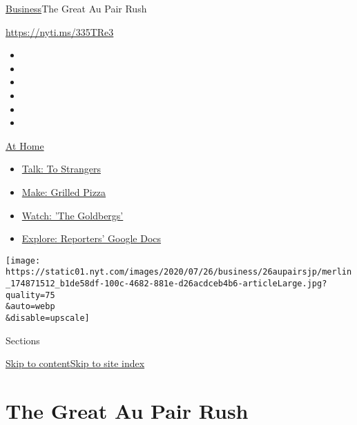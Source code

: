 \href{/section/business}{Business}\textbar{}The Great Au Pair Rush

\url{https://nyti.ms/335TRe3}

\begin{itemize}
\item
\item
\item
\item
\item
\item
\end{itemize}

\href{https://www.nytimes.com/spotlight/at-home?action=click\&pgtype=Article\&state=default\&region=TOP_BANNER\&context=at_home_menu}{At
Home}

\begin{itemize}
\tightlist
\item
  \href{https://www.nytimes.com/2020/08/03/well/family/the-benefits-of-talking-to-strangers.html?action=click\&pgtype=Article\&state=default\&region=TOP_BANNER\&context=at_home_menu}{Talk:
  To Strangers}
\item
  \href{https://www.nytimes.com/2020/08/01/at-home/coronavirus-make-pizza-on-a-grill.html?action=click\&pgtype=Article\&state=default\&region=TOP_BANNER\&context=at_home_menu}{Make:
  Grilled Pizza}
\item
  \href{https://www.nytimes.com/2020/07/31/arts/television/goldbergs-abc-stream.html?action=click\&pgtype=Article\&state=default\&region=TOP_BANNER\&context=at_home_menu}{Watch:
  'The Goldbergs'}
\item
  \href{https://www.nytimes.com/interactive/2020/at-home/even-more-reporters-editors-diaries-lists-recommendations.html?action=click\&pgtype=Article\&state=default\&region=TOP_BANNER\&context=at_home_menu}{Explore:
  Reporters' Google Docs}
\end{itemize}

\texttt{[image: https://static01.nyt.com/images/2020/07/26/business/26aupairsjp/merlin\_174871512\_b1de58df-100c-4682-881e-d26acdceb4b6-articleLarge.jpg?quality=75\\\&auto=webp\\\&disable=upscale]}

Sections

\protect\hyperlink{site-content}{Skip to
content}\protect\hyperlink{site-index}{Skip to site index}

\hypertarget{the-great-au-pair-rush}{%
\section{The Great Au Pair Rush}\label{the-great-au-pair-rush}}

